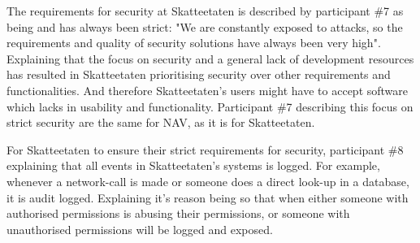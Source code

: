 
The requirements for security at Skatteetaten is described by participant \#7 as being and has always been strict: "We are constantly exposed to attacks, so the requirements and quality of security solutions have always been very high". Explaining that the focus on security and a general lack of development resources has resulted in Skatteetaten prioritising security over other requirements and functionalities. And therefore Skatteetaten's users might have to accept software which lacks in usability and functionality. Participant \#7 describing this focus on strict security are the same for NAV, as it is for Skatteetaten.


For Skatteetaten to ensure their strict requirements for security, participant \#8 explaining that all events in Skatteetaten's systems is logged. For example, whenever a network-call is made or someone does a direct look-up in a database, it is audit logged. Explaining it's reason being so that when either someone with authorised permissions is abusing their permissions, or someone with unauthorised permissions will be logged and exposed.


